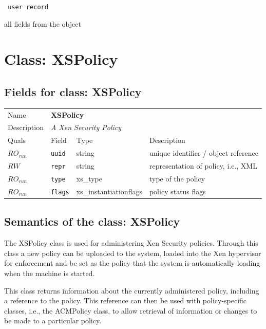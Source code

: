\vspace{0.3cm}

{\tt 
user record
}


all fields from the object
\vspace{0.3cm}
\vspace{0.3cm}
\vspace{0.3cm}

\vspace{1cm}
\newpage
\section{Class: XSPolicy}
\subsection{Fields for class: XSPolicy}
\begin{longtable}{|lllp{}|}
\hline
\multicolumn{1}{|l}{Name} & \multicolumn{3}{l|}{\bf XSPolicy} \\
\multicolumn{1}{|l}{Description} & \multicolumn{3}{l|}{\parbox{11cm}{\em A Xen Security Policy}} \\
\hline
Quals & Field & Type & Description \\
\hline
$\mathit{RO}_\mathit{run}$ &  {\tt uuid} & string  & unique identifier / object reference \\
$\mathit{RW}$              &  {\tt repr} & string  & representation of policy, i.e., XML \\
$\mathit{RO}_\mathit{run}$ &  {\tt type} & xs\_type & type of the policy \\
$\mathit{RO}_\mathit{run}$ & {\tt flags} & xs\_instantiationflags & policy
status flags \\
\hline
\end{longtable}
\subsection{Semantics of the class: XSPolicy}

The XSPolicy class is used for administering Xen Security policies. Through
this class a new policy can be uploaded to the system, loaded into the
Xen hypervisor for enforcement and be set as the policy that the
system is automatically loading when the machine is started.

This class returns information about the currently administered policy,
including a reference to the policy. This reference can then be used with
policy-specific classes, i.e., the ACMPolicy class, to allow retrieval of
information or changes to be made to a particular policy.

